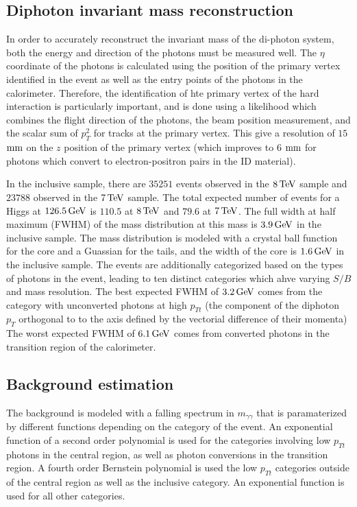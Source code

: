\subsection{Diphoton invariant mass reconstruction}

In order to accurately reconstruct the invariant mass of the di-photon system, both the energy and direction of the photons must be measured well. The $\eta$ coordinate of the photons is calculated using the position of the primary vertex identified in the event as well as the entry points of the photons in the calorimeter. Therefore, the identification of hte primary vertex of the hard interaction is particularly important, and is done using a likelihood which combines the flight direction of the photons, the beam position measurement, and the scalar sum of $p_{T}^2$ for tracks at the primary vertex. This give a resolution of $15$ $\rm mm$ on the $z$ position of the primary vertex (which improves to $6$ $\rm mm$ for photons which convert to electron-positron pairs in the ID material). 

In the inclusive sample, there are $35251$ events observed in the $8 \TeV$ sample and $23788$ observed in the $7 \TeV$ sample. The total expected number of events for a Higgs at $126.5 \GeV$ is $110.5$ at $8 \TeV$ and $79.6$ at $7 \TeV$. The full width at half maximum (FWHM) of the mass distribution at this mass is $3.9 \GeV$ in the inclusive sample. The mass distribution is modeled with a crystal ball function for the core and a Guassian for the tails, and the width of the core is $1.6 \GeV$ in the inclusive sample. The events are additionally categorized based on the types of photons in the event, leading to ten distinct categories which ahve varying $S/B$ and mass resolution. The best expected FWHM of $3.2 \GeV$ comes from the category with unconverted photons at high $p_{Tt}$ (the component of the diphoton $p_{T}$ orthogonal to to the axis defined by the vectorial difference of their momenta) The worst expected FWHM of $6.1 \GeV$ comes from converted photons in the transition region of the calorimeter. 

\subsection{Background estimation}

The background is modeled with a falling spectrum in $m_{\gamma\gamma}$ that is paramaterized by different functions depending on the category of the event. An exponential function of a second order polynomial is used for the categories involving low $p_{Tt}$ photons in the central region, as well as photon conversions in the transition region. A fourth order Bernstein polynomial is used the low $p_{Tt}$ categories outside of the central region as well as the inclusive category. An exponential function is used for all other categories. 

